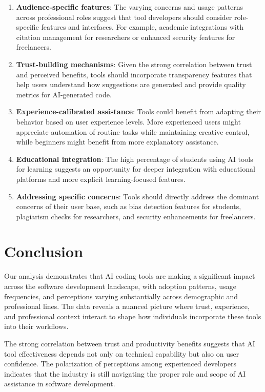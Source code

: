 \documentclass[conference]{IEEEtran}
\begin{document}
\begin{enumerate}
    \item \textbf{Audience-specific features}: The varying concerns and usage patterns across professional roles suggest that tool developers should consider role-specific features and interfaces. For example, academic integrations with citation management for researchers or enhanced security features for freelancers.

    \item \textbf{Trust-building mechanisms}: Given the strong correlation between trust and perceived benefits, tools should incorporate transparency features that help users understand how suggestions are generated and provide quality metrics for AI-generated code.

    \item \textbf{Experience-calibrated assistance}: Tools could benefit from adapting their behavior based on user experience levels. More experienced users might appreciate automation of routine tasks while maintaining creative control, while beginners might benefit from more explanatory assistance.

    \item \textbf{Educational integration}: The high percentage of students using AI tools for learning suggests an opportunity for deeper integration with educational platforms and more explicit learning-focused features.

    \item \textbf{Addressing specific concerns}: Tools should directly address the dominant concerns of their user base, such as bias detection features for students, plagiarism checks for researchers, and security enhancements for freelancers.
\end{enumerate}

\section{Conclusion}
Our analysis demonstrates that AI coding tools are making a significant impact across the software development landscape, with adoption patterns, usage frequencies, and perceptions varying substantially across demographic and professional lines. The data reveals a nuanced picture where trust, experience, and professional context interact to shape how individuals incorporate these tools into their workflows.

The strong correlation between trust and productivity benefits suggests that AI tool effectiveness depends not only on technical capability but also on user confidence. The polarization of perceptions among experienced developers indicates that the industry is still navigating the proper role and scope of AI assistance in software development.
\end{document}
